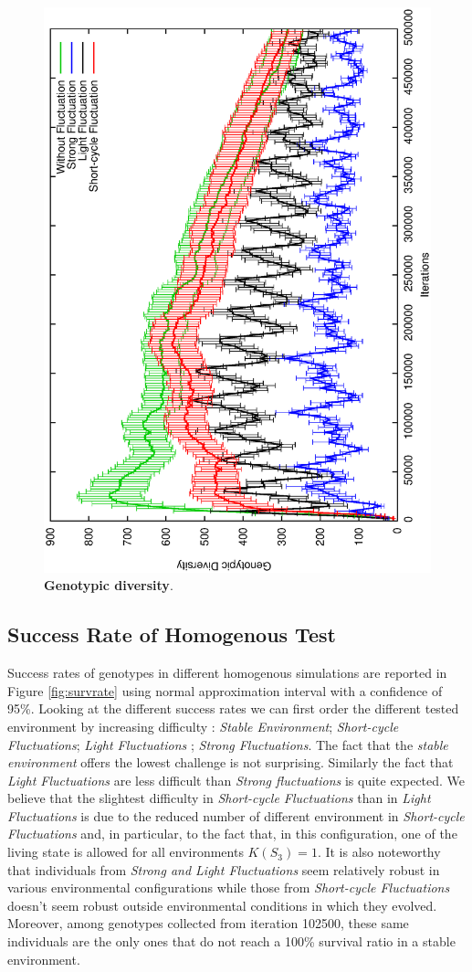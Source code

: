 \begin{figure}[h]
\centering
\includegraphics[width=0.7\columnwidth, angle =-90 ]{img/GenoDiv}
\caption{\textbf{Genotypic diversity}.}
\label{fig:genodiv}
\end{figure}

\subsection{Success Rate of Homogenous Test}
Success rates of genotypes in different homogenous simulations are reported in Figure \ref{fig:survrate} using normal approximation interval with a confidence of 95\%. Looking at the different success rates we can first order the different tested environment by increasing difficulty : \emph{Stable Environment}; \emph{Short-cycle Fluctuations}; \emph{Light Fluctuations} ; \emph{Strong Fluctuations}. The fact that the \emph{stable environment} offers the lowest challenge is not surprising. Similarly the fact that \emph{Light Fluctuations} are less difficult than \emph{Strong fluctuations} is quite expected. We believe that the slightest difficulty in \emph{Short-cycle Fluctuations} than in \emph{Light Fluctuations} is due to the reduced number of different environment in \emph{Short-cycle Fluctuations} and, in particular, to the fact that, in this configuration, one of the living state is allowed for all environments $K(S_3)=1$. It is also noteworthy that individuals from \emph{Strong and Light Fluctuations} seem relatively robust in various environmental configurations while those from \emph{Short-cycle Fluctuations} doesn't seem robust outside environmental conditions in which they evolved. Moreover, among genotypes collected from iteration 102500, these same individuals are the only ones that do not reach a 100\% survival ratio in a stable environment.


